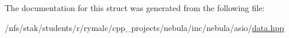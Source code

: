 


The documentation for this struct was generated from the following file:\begin{DoxyCompactItemize}
\item 
/nfs/stak/students/r/rymalc/cpp\_\-projects/nebula/inc/nebula/asio/\hyperlink{data_8hpp}{data.hpp}\end{DoxyCompactItemize}
